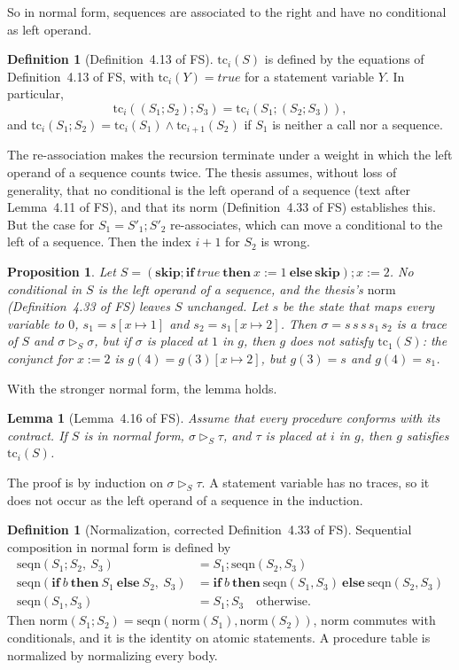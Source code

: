 \documentclass[11pt]{article}
\newcommand{\kw}[1]{\mathbf{#1}}
\newcommand{\skipS}{\kw{skip}}
\newcommand{\ite}[3]{\kw{if}\ #1\ \kw{then}\ #2\ \kw{else}\ #3}
\newcommand{\tc}{\mathrm{tc}}
\newcommand{\norm}{\mathrm{norm}}
\newcommand{\seqn}{\mathrm{seqn}}
\newcommand{\eff}{\rhd}
\newcommand{\Th}[1]{#1 of FS}
\theoremstyle{plain}
\newtheorem{lemma}[theorem]{Lemma}
\newtheorem{proposition}[theorem]{Proposition}
\theoremstyle{definition}
\newtheorem{definition}[theorem]{Definition}
\theoremstyle{remark}
\begin{document}
So in normal form, sequences are associated to the right and have no
conditional as left operand.

\begin{definition}[\Th{Definition~4.13}]
  $\tc_i(S)$ is defined by the equations of \Th{Definition~4.13}, with
  $\tc_i(Y) = \mathit{true}$ for a statement variable $Y$. In particular,
  \[\tc_i((S_1; S_2); S_3) = \tc_i(S_1; (S_2; S_3)),\]
  and
  $\tc_i(S_1; S_2) = \tc_i(S_1) \land \tc_{i+1}(S_2)$ if $S_1$ is neither a
  call nor a sequence.
\end{definition}

The re-association makes the recursion terminate under a weight in which
the left operand of a sequence counts twice. The thesis assumes,
without loss of generality, that no conditional is the left operand of a
sequence (text after \Th{Lemma~4.11}), and that its $\norm$
(\Th{Definition~4.33}) establishes this. But the case for $S_1 = S'_1;S'_2$
re-associates, which can move a conditional to the left of a sequence.
Then the index $i+1$ for $S_2$ is wrong.

\begin{proposition}\label{prop:shape}
  Let $S = (\skipS; \ite{\mathit{true}}{x := 1}{\skipS}); x := 2$. No
  conditional in $S$ is the left operand of a sequence, and the thesis's
  $\norm$ (\Th{Definition~4.33}) leaves $S$ unchanged. Let $s$ be the
  state that maps every variable to $0$, $s_1 = s[x \mapsto 1]$ and
  $s_2 = s_1[x \mapsto 2]$. Then $\sigma = s\,s\,s\,s_1\,s_2$ is a trace of
  $S$ and $\sigma \eff_S \sigma$, but if $\sigma$ is placed at $1$ in $g$,
  then $g$ does not satisfy $\tc_1(S)$: the conjunct for $x := 2$ is
  $g(4) = g(3)[x \mapsto 2]$, but $g(3) = s$ and $g(4) = s_1$.
\end{proposition}

With the stronger normal form, the lemma holds.

\begin{lemma}[\Th{Lemma~4.16}]\label{lem:tc}
  Assume that every procedure conforms with its contract. If $S$ is in
  normal form, $\sigma \eff_S \tau$, and $\tau$ is placed at $i$ in $g$,
  then $g$ satisfies $\tc_i(S)$.
\end{lemma}

The proof is by induction on $\sigma \eff_S \tau$. A statement variable
has no traces, so it does not occur as the left operand of a sequence in
the induction.

\begin{definition}[Normalization, corrected \Th{Definition~4.33}]
  \label{def:norm}
  Sequential composition in normal form is defined by
  \begin{align*}
    \seqn(S_1; S_2,\ S_3) &= S_1; \seqn(S_2, S_3)\\
    \seqn(\ite{b}{S_1}{S_2},\ S_3) &=
      \ite{b}{\seqn(S_1, S_3)}{\seqn(S_2, S_3)}\\
    \seqn(S_1, S_3) &= S_1; S_3 \quad \text{otherwise.}
  \end{align*}
  Then $\norm(S_1;S_2) = \seqn(\norm(S_1), \norm(S_2))$, $\norm$ commutes
  with conditionals, and it is the identity on atomic statements. A
  procedure table is normalized by normalizing every body.
\end{definition}
\end{document}
